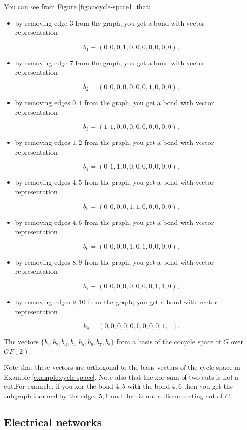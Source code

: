 \begin{example}
{You can see from Figure \ref{fig:cocycle-space1} that:

\begin{itemize}
\item
by removing edge $3$ from the graph, you get a bond with vector
representation

\[
b_1 = (0,0,0,1,0,0,0,0,0,0,0),
\]
\item
by removing edge $7$ from the graph, you get a bond with vector
representation

\[
b_2 = (0,0,0,0,0,0,0,1,0,0,0),
\]
\item
by removing edges $0,1$ from the graph, you get a bond with vector
representation

\[
b_3 = (1,1,0,0,0,0,0,0,0,0,0),
\]
\item
by removing edges $1,2$ from the graph, you get a bond with vector
representation

\[
b_4 = (0,1,1,0,0,0,0,0,0,0,0),
\]
\item
by removing edges $4,5$ from the graph, you get a bond with vector
representation

\[
b_5 = (0,0,0,0,1,1,0,0,0,0,0),
\]
\item
by removing edges $4,6$ from the graph, you get a bond with vector
representation

\[
b_6 = (0,0,0,0,1,0,1,0,0,0,0),
\]
\item
by removing edges $8,9$ from the graph, you get a bond with vector
representation

\[
b_7 = (0,0,0,0,0,0,0,0,1,1,0),
\]
\item
by removing edges $9,10$ from the graph, you get a bond with vector
representation

\[
b_8 = (0,0,0,0,0,0,0,0,0,1,1).
\]
\end{itemize}
The vectors $\{b_1,b_2,b_3,b_4,b_5,b_6,b_7,b_8\}$ form a basis of the
cocycle space of $G$ over $GF(2)$.

Note that these vectors are orthogonal to the basis vectors of
the cycle space in Example \ref{example:cycle-space}. Note also that
the xor sum of two cuts is not a cut.For example, if you xor the bond
$4,5$ with the bond $4,6$ then you get the subgraph foormed by the
edges $5,6$ and that is not a disconnecting cut of $G$.
}
\end{example}



\subsection{Electrical networks}

